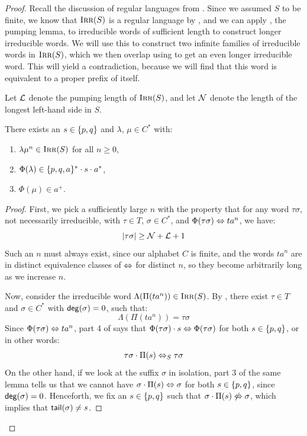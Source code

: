 \documentclass[../generics]{subfiles}
\begin{document}
\begin{proof}
Recall the discussion of regular languages from . Since we assumed $S$ to be finite, we know that $\textsc{Irr}(S)$ is a regular language by , and we can apply , the pumping lemma, to irreducible words of sufficient length to construct longer irreducible words. We will use this to construct two infinite families of irreducible words in $\textsc{Irr}(S)$, which we then overlap using  to get an even longer irreducible word. This will yield a contradiction, because we will find that this word is equivalent to a proper prefix of itself.

\begin{definition}
Let $\mathcal{L}$ denote the pumping length of $\textsc{Irr}(S)$, and let $\mathcal{N}$ denote the length of the longest left-hand side in $S$.
\end{definition}

\begin{lemma}\label{lemma:tpqa first pump}
There exists an $s \in \{p,q\}$ and $\lambda$, $\mu \in C^*$ with:
\begin{enumerate}
\item $\lambda\mu^n \in \textsc{Irr}(S)$ for all $n \geq 0$,
\item $\Phi(\lambda) \in \{p,q,a\}^* \cdot s \cdot a^*$,
\item $\Phi(\mu) \in a^+$.
\end{enumerate}
\end{lemma}
\begin{proof}
First, we pick a sufficiently large $n$ with the property that for any word $\tau \sigma$, not necessarily irreducible, with $\tau \in T$, $\sigma \in C^*$, and $\Phi(\tau \sigma) \Leftrightarrow ta^n$, we have:
\[
|\tau\sigma| \geq \mathcal{N} + \mathcal{L} + 1
\]
Such an $n$ must always exist, since our alphabet $C$ is finite, and the words $ta^n$ are in distinct equivalence classes of $\Leftrightarrow$ for distinct $n$, so they become arbitrarily long as we increase $n$.

Now, consider the irreducible word $\Lambda(\Pi(ta^n)) \in \textsc{Irr}(S)$. By , there exist $\tau \in T$ and $\sigma \in C^*$ with $\mathsf{deg}(\sigma)=0$, such that:
\[
\Lambda(\Pi(t a^n))=\tau \sigma
\]
Since $\Phi(\tau\sigma) \Leftrightarrow ta^n$, part 4 of  says that $\Phi(\tau\sigma) \cdot s \Leftrightarrow \Phi(\tau\sigma)$ for both $s \in \{p,q\}$, or in other words:
\[
\tau\sigma \cdot \Pi(s) \Leftrightarrow_S \tau\sigma
\]
On the other hand, if we look at the suffix $\sigma$ in isolation, part 3 of the same lemma tells us that we cannot have $\sigma \cdot \Pi(s) \Leftrightarrow \sigma$ for both $s \in \{p,q\}$, since $\mathsf{deg}(\sigma)=0$. Henceforth, we fix an $s \in \{p,q\}$ such that $\sigma \cdot \Pi(s) \not\Leftrightarrow \sigma$, which implies that $\mathsf{tail}(\sigma) \neq s$.


\end{proof}
\end{proof}
\end{document}
